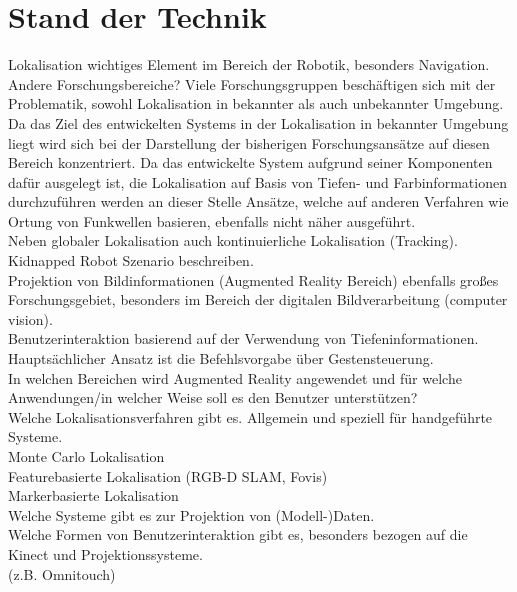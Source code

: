 \chapter{Stand der Technik}
\label{chap:tech}
Lokalisation wichtiges Element im Bereich der Robotik, besonders Navigation. Andere Forschungsbereiche?
Viele Forschungsgruppen beschäftigen sich mit der Problematik, sowohl Lokalisation in bekannter als auch unbekannter Umgebung.
Da das Ziel des entwickelten Systems in der Lokalisation in bekannter Umgebung liegt wird sich bei der Darstellung der bisherigen Forschungsansätze auf diesen Bereich konzentriert. Da das entwickelte System aufgrund seiner Komponenten dafür ausgelegt ist, die Lokalisation auf Basis von Tiefen- und Farbinformationen durchzuführen werden an dieser Stelle Ansätze, welche auf anderen Verfahren wie Ortung von Funkwellen basieren, ebenfalls nicht näher ausgeführt.\\

Neben globaler Lokalisation auch kontinuierliche Lokalisation (Tracking). Kidnapped Robot Szenario beschreiben.\\

Projektion von Bildinformationen (Augmented Reality Bereich) ebenfalls großes Forschungsgebiet, besonders im Bereich der digitalen Bildverarbeitung (computer vision).\\

Benutzerinteraktion basierend auf der Verwendung von Tiefeninformationen. Hauptsächlicher Ansatz ist die Befehlsvorgabe über Gestensteuerung.\\
In welchen Bereichen wird Augmented Reality angewendet und für welche Anwendungen/in welcher Weise soll es den Benutzer unterstützen?\\


Welche Lokalisationsverfahren gibt es. Allgemein und speziell für handgeführte Systeme.\\
Monte Carlo Lokalisation\\
Featurebasierte Lokalisation (RGB-D SLAM, Fovis)\\
Markerbasierte Lokalisation\\

Welche Systeme gibt es zur Projektion von (Modell-)Daten.\\


Welche Formen von Benutzerinteraktion gibt es, besonders bezogen auf die Kinect und Projektionssysteme.\\
(z.B. Omnitouch)